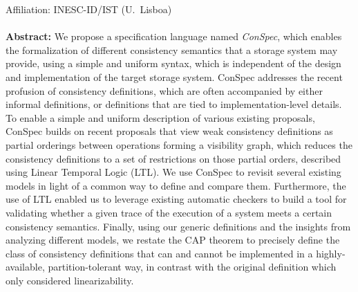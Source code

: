 \documentclass[acmlarge, ,11pt]{acmart}
\begin{document}
 Affiliation: INESC-ID/IST (U.\ Lisboa) \\ \\%
\textbf{Abstract:}
 We propose a specification language named \emph{ConSpec}, which enables the formalization of
 different consistency semantics that a storage system may provide, using a simple and uniform syntax, which is independent
 of the design and implementation of the target storage system. ConSpec addresses the recent profusion of consistency definitions,
 which are often accompanied by either informal definitions, or definitions that are tied to implementation-level details.
To enable a simple and uniform description of various existing proposals, ConSpec builds on recent proposals that view weak consistency
definitions as partial orderings between operations forming a visibility graph, which reduces the consistency definitions to a set of
restrictions on those partial orders, described using Linear Temporal Logic (LTL). We use ConSpec to revisit several existing models in light
of a common way to define and compare them. Furthermore, the use
of LTL enabled us to leverage existing automatic checkers to build a tool for validating whether a given trace of the execution of a system meets
a certain consistency semantics.
Finally, using our generic definitions and the insights from analyzing different models, we restate the CAP theorem to precisely define the class of consistency definitions that can and cannot be implemented in a highly-available, partition-tolerant way, in contrast with the original definition which only considered linearizability. %
\end{document}
